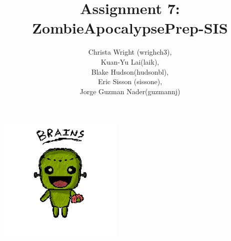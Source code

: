 \documentclass[a4paper]{article}
\title{Assignment 7: ZombieApocalypsePrep-SIS}
\author{Christa Wright (wrighch3),\\ Kuan-Yu Lai(laik),\\ Blake Hudson(hudsonbl), \\Eric Sisson (sissone), \\ Jorge Guzman Nader(guzmannj)}
\begin{document}
\maketitle
\includegraphics[width=\textwidth]{zombie.jpg}
\pagebreak
\tableofcontents
\pagebreak
\end{document}
